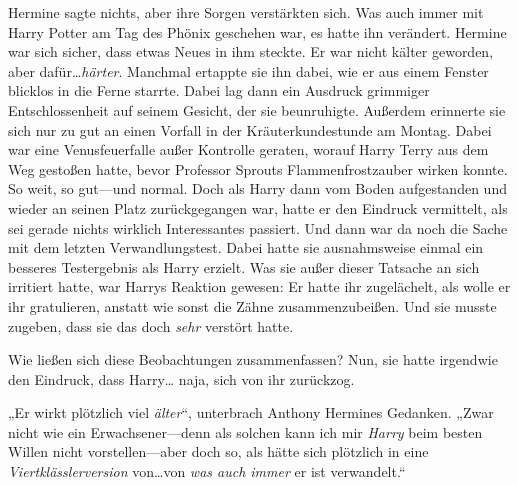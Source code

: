 Hermine sagte nichts, aber ihre Sorgen verstärkten sich.
Was auch immer mit Harry Potter am Tag des Phönix geschehen war, es hatte ihn verändert. Hermine war sich sicher, dass etwas Neues in ihm steckte. Er war nicht kälter geworden, aber dafür…\emph{härter}. Manchmal ertappte sie ihn dabei, wie er aus einem Fenster blicklos in die Ferne starrte. Dabei lag dann ein Ausdruck grimmiger Entschlossenheit auf seinem Gesicht, der sie beunruhigte. Außerdem erinnerte sie sich nur zu gut an einen Vorfall in der Kräuterkundestunde am Montag. Dabei war eine Venusfeuerfalle außer Kontrolle geraten, worauf Harry Terry aus dem Weg gestoßen hatte, bevor Professor Sprouts Flammenfrostzauber wirken konnte. So weit, so gut—und normal. Doch als Harry dann vom Boden aufgestanden und wieder an seinen Platz zurückgegangen war, hatte er den Eindruck vermittelt, als sei gerade nichts wirklich Interessantes passiert.
Und dann war da noch die Sache mit dem letzten Verwandlungstest. Dabei hatte sie ausnahmsweise einmal ein besseres Testergebnis als Harry erzielt. Was sie außer dieser Tatsache an sich irritiert hatte, war Harrys Reaktion gewesen: Er hatte ihr zugelächelt, als wolle er ihr gratulieren, anstatt wie sonst die Zähne zusammenzubeißen. Und sie musste zugeben, dass sie das doch \emph{sehr} verstört hatte.

%
Wie ließen sich diese Beobachtungen zusammenfassen? Nun, sie hatte irgendwie den Eindruck, dass Harry… naja, sich von ihr zurückzog.

„Er wirkt plötzlich viel \emph{älter}“, unterbrach Anthony Hermines Gedanken. „Zwar nicht wie ein Erwachsener—denn als solchen kann ich mir \emph{Harry} beim besten Willen nicht vorstellen—aber doch so, als hätte sich plötzlich in eine \emph{Viertklässlerversion} von…von \emph{was auch immer} er ist verwandelt.“

